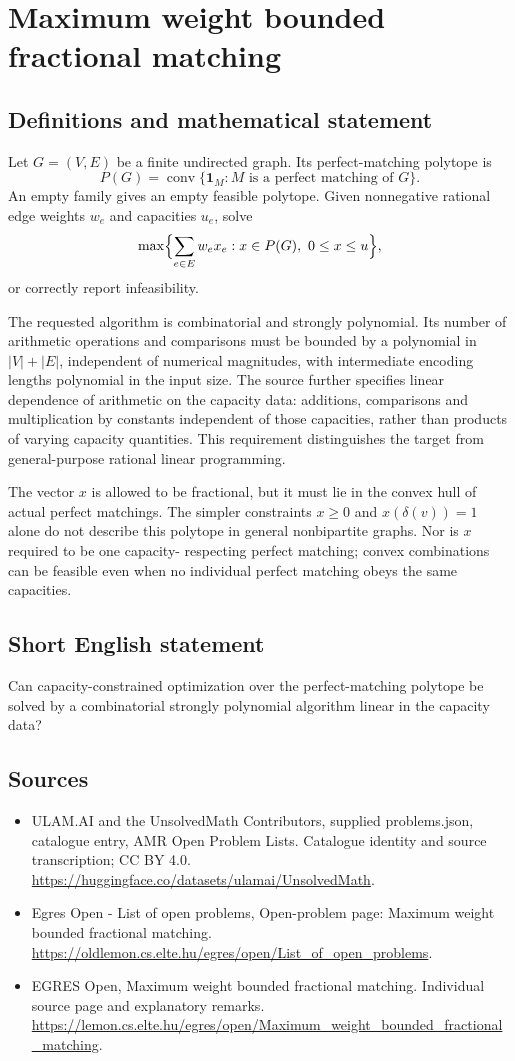 \documentclass[11pt,a4paper]{article}
\begin{document}
\section*{Maximum weight bounded fractional matching}\label{statement}

\subsection{Definitions and mathematical statement}
Let $G=(V,E)$ be a finite undirected graph. Its perfect-matching
polytope is
\[
       P(G)=\operatorname{conv}\{\mathbf1_M:M\text{ is a perfect matching of }G\}.
\]
An empty family gives an empty feasible polytope. Given nonnegative
rational edge weights $w_e$ and capacities $u_e$, solve
\[
                  \max\Bigl\{\sum_{e\in E}w_ex_e:
                                    x\in P(G),\ 0\le x\le u\Bigr\},
\]
or correctly report infeasibility.

The requested algorithm is combinatorial and strongly polynomial.
Its number of arithmetic operations and comparisons must be bounded
by a polynomial in $|V|+|E|$, independent of numerical magnitudes,
with intermediate encoding lengths polynomial in the input size.
The source further specifies linear dependence of arithmetic on the
capacity data: additions, comparisons and multiplication by constants
independent of those capacities, rather than products of varying
capacity quantities. This requirement distinguishes the target from
general-purpose rational linear programming.

The vector $x$ is allowed to be fractional, but it must lie in the
convex hull of actual perfect matchings. The simpler constraints
$x\ge0$ and $x(\delta(v))=1$ alone do not describe this polytope in
general nonbipartite graphs. Nor is $x$ required to be one capacity-
respecting perfect matching; convex combinations can be feasible
even when no individual perfect matching obeys the same capacities.
\subsection{Short English statement}
Can capacity-constrained optimization over the perfect-matching
polytope be solved by a combinatorial strongly polynomial algorithm linear in the capacity data?
\subsection{Sources}
\begin{itemize}
\item[S1] ULAM.AI and the UnsolvedMath Contributors, supplied problems.json, catalogue entry, AMR Open Problem Lists. Catalogue identity and source transcription; CC BY 4.0.
\url{https://huggingface.co/datasets/ulamai/UnsolvedMath}.
\item[S2] Egres Open - List of open problems, Open-problem page: Maximum weight bounded fractional matching. 
\url{https://oldlemon.cs.elte.hu/egres/open/List_of_open_problems}.
\item[S3] EGRES Open, Maximum weight bounded fractional matching. Individual source page and explanatory remarks.
\url{https://lemon.cs.elte.hu/egres/open/Maximum_weight_bounded_fractional_matching}.
\end{itemize}
\end{document}
